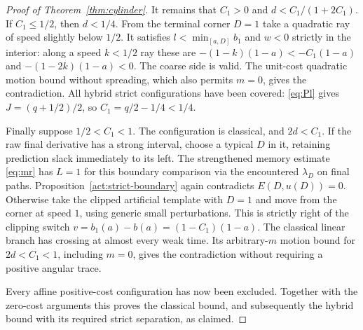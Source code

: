 \begin{proof}[Proof of Theorem~\ref{thm:cylinder}]
It remains that $C_1>0$ and $d<C_1/(1+2C_1)$.
If $C_1\le1/2$, then $d<1/4$.  From the terminal corner
$D=1$ take a quadratic ray of speed slightly below $1/2$.
It satisfies $l<\min_{[a,D]}b_1$ and $w<0$ strictly in the
interior: along a speed $k<1/2$ ray these are
$-(1-k)(1-a)<-C_1(1-a)$ and
$-(1-2k)(1-a)<0$.  The coarse side is valid.
The unit-cost quadratic motion bound without spreading, which
also permits $m=0$, gives the contradiction.
All hybrid strict configurations have been covered:
\eqref{eq:Pl} gives $J=(q+1/2)/2$, so
$C_1=q/2-1/4<1/4$.

Finally suppose $1/2<C_1<1$.  The configuration is classical,
and $2d<C_1$.  If the raw final derivative has a strong interval,
choose a typical $D$ in it, retaining prediction slack immediately
to its left.  The strengthened memory estimate \eqref{eq:mr}
has $L=1$ for this boundary comparison via the encountered
$\lambda_D$ on final paths.  Proposition~\ref{act:strict-boundary}
again contradicts $E(D,u(D))=0$.
Otherwise take the clipped artificial template with $D=1$ and
move from the corner at speed $1$, using generic small
perturbations.  This is strictly right of the clipping switch
$v=b_1(a)-b(a)=(1-C_1)(1-a)$.  The classical linear branch has
crossing at almost every weak time.  Its arbitrary-$m$ motion
bound for $2d<C_1<1$, including $m=0$, gives the contradiction
without requiring a positive angular trace.

Every affine positive-cost configuration has now been excluded.
Together with the zero-cost arguments this proves the classical
bound, and subsequently the hybrid bound with its required
strict separation, as claimed.
\end{proof}
